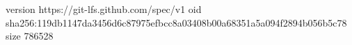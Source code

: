 version https://git-lfs.github.com/spec/v1
oid sha256:119db1147da3456d6c87975efbcc8a03408b00a68351a5a094f2894b056b5c78
size 786528
